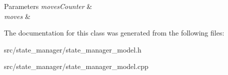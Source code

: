 \begin{DoxyParams}{Parameters}
{\em moves\+Counter} & \\
\hline
{\em moves} & \\
\hline
\end{DoxyParams}


The documentation for this class was generated from the following files\+:\begin{DoxyCompactItemize}
\item 
src/state\+\_\+manager/state\+\_\+manager\+\_\+model.\+h\item 
src/state\+\_\+manager/state\+\_\+manager\+\_\+model.\+cpp\end{DoxyCompactItemize}
